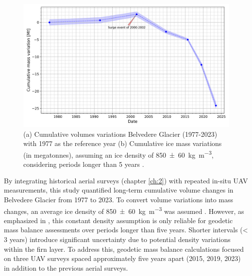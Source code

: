 \begin{figure}[ht]
  \centering
    \includegraphics[width=\textwidth]{cumulative_mass_changes_all.png}
    \caption{(a) Cumulative volumes variations Belvedere Glacier (1977-2023) with 1977 as the reference year (b) Cumulative ice mass variations (in megatonnes), assuming an ice density of \SI[separate-uncertainty = true]{850 \pm 60}{\kilo\gram\per\cubic\meter}, considering periods longer than 5 years \cite{Huss2013_density_geodetic_balance}. %
    } 
  \label{fig:3:cumulative_volumes_mass}
\end{figure}

By integrating historical aerial surveys (chapter \ref{ch:2}) with repeated in-situ UAV measurements, this study quantified long-term cumulative volume changes in Belvedere Glacier from 1977 to 2023.
To convert volume variations into mass changes, an average ice density of \SI[separate-uncertainty = true]{850 \pm 60}{\kilo\gram\per\cubic\meter} was assumed \citep{Huss2013_density_geodetic_balance}. 
However, as emphasized in \citet{Huss2013_density_geodetic_balance}, this constant density assumption is only reliable for geodetic mass balance assessments over periods longer than five years.
Shorter intervals (< 3 years) introduce significant uncertainty due to potential density variations within the firn layer.
To address this, geodetic mass balance calculations focused on three UAV surveys spaced approximately five years apart (2015, 2019, 2023) in addition to the previous aerial surveys.  

